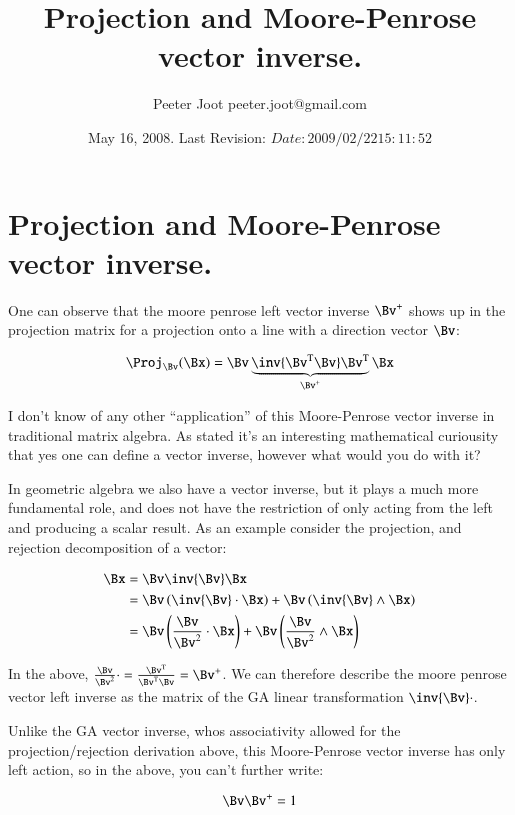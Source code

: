 \documentclass{article}      %
\title{ Projection and Moore-Penrose vector inverse. }
\author{Peeter Joot \quad peeter.joot@gmail.com}         %
\date{ May 16, 2008.  Last Revision: $Date: 2009/02/22 15:11:52 $ }
\newcommand{\T}[0]{{\text{T}}}
\begin{document}

\maketitle{}

\section{ Projection and Moore-Penrose vector inverse. }

One can observe that the moore penrose left vector inverse $\Bv^+$ shows up in the projection matrix for a projection onto a line with a direction vector $\Bv$:

\begin{equation}
\Proj_\Bv(\Bx) = \Bv \underbrace{\inv{ \Bv^\T \Bv} \Bv^\T}_{\Bv^+} \Bx
\end{equation}

I don't know of any other ``application'' of this Moore-Penrose vector inverse in traditional matrix algebra.  As stated it's an interesting mathematical curiousity that yes one can define a vector inverse, however what would you do with it?

In geometric algebra we also have a vector inverse, but it plays a much more fundamental role, and does not have the restriction of only acting from the left and 
producing a scalar result.  As an example consider the projection, and rejection decomposition of a vector:

\begin{align*}
\Bx 
&= \Bv \inv{\Bv} \Bx \\
&= \Bv \left(\inv{\Bv} \cdot \Bx\right) + \Bv \left(\inv{\Bv} \wedge \Bx\right) \\
&= \Bv 
\left(
\frac{\Bv}{\Bv^2} \cdot 
 \Bx\right)
 + \Bv \left(\frac{\Bv}{\Bv^2} \wedge \Bx\right) \\
\end{align*}

In the above, $\frac{\Bv}{\Bv^2} \cdot = \frac{\Bv^\T}{\Bv^\T \Bv} = \Bv^+$.  We can therefore describe the moore penrose vector left inverse as the matrix of the GA linear transformation $\inv{\Bv} \cdot$.

Unlike the GA vector inverse, whos associativity allowed for the projection/rejection derivation above, this Moore-Penrose vector inverse has only left action, so in the above, you can't further write:

\[
\Bv \Bv^{+} = 1
\]
\end{document}
